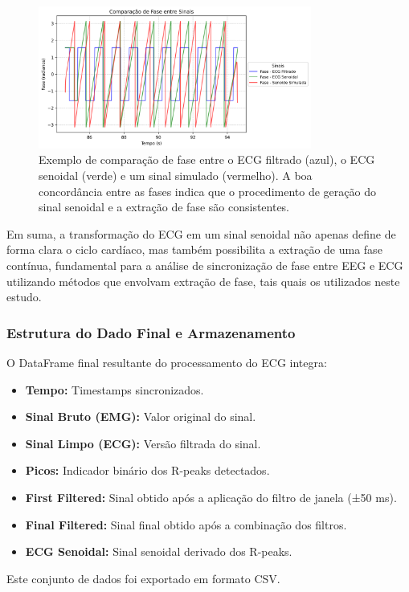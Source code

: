 \begin{figure}[htb]
    \centering
    \includegraphics[width=0.8\textwidth]{figs/2_preprocessamento_ecg/3_Comparação_de_Fase_entre_Sinais.png}
    \caption{Exemplo de comparação de fase entre o ECG filtrado (azul), o ECG senoidal (verde) e um sinal simulado (vermelho). A boa concordância entre as fases indica que o procedimento de geração do sinal senoidal e a extração de fase são consistentes.}
    \label{fig:ecg_comparacao_fase}
\end{figure}

Em suma, a transformação do ECG em um sinal senoidal não apenas define de forma clara o ciclo cardíaco, mas também possibilita a extração de uma fase contínua, fundamental para a análise de sincronização de fase entre EEG e ECG utilizando métodos que envolvam extração de fase, tais quais os utilizados neste estudo.

\subsubsection{Estrutura do Dado Final e Armazenamento}

O DataFrame final resultante do processamento do ECG integra:
\begin{itemize}
    \item \textbf{Tempo:} Timestamps sincronizados.
    \item \textbf{Sinal Bruto (EMG):} Valor original do sinal.
    \item \textbf{Sinal Limpo (ECG):} Versão filtrada do sinal.
    \item \textbf{Picos:} Indicador binário dos R-peaks detectados.
    \item \textbf{First Filtered:} Sinal obtido após a aplicação do filtro de janela (±50 ms).
    \item \textbf{Final Filtered:} Sinal final obtido após a combinação dos filtros.
    \item \textbf{ECG Senoidal:} Sinal senoidal derivado dos R-peaks.
\end{itemize}
Este conjunto de dados foi exportado em formato CSV.